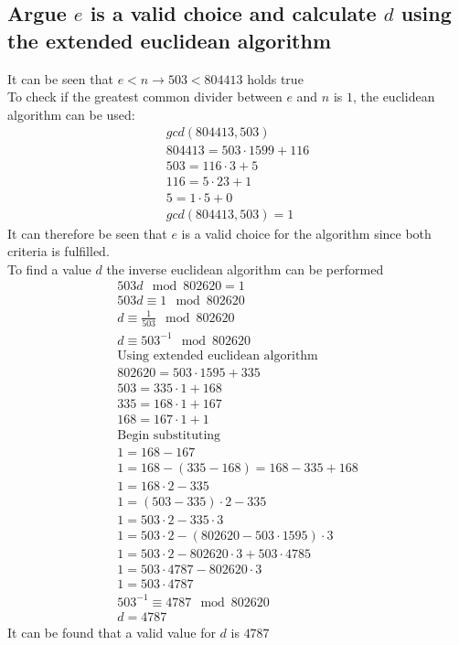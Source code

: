 \documentclass[12pt, a4paper]{article}
\begin{document}
		\subsection{Argue $e$ is a valid choice and calculate $d$ using the extended euclidean algorithm}
			It can be seen that $e<n\rightarrow 503 < 804413$ holds true\\
			To check if the greatest common divider between $e$ and $n$ is $1$, the euclidean algorithm can be used:
			\begin{align*}
				gcd(804413,503)\\
				804413 = 503\cdot 1599+116\\
				503=116\cdot 3+5\\
				116=5\cdot 23+1\\
				5=1\cdot 5+0\\
				gcd(804413,503)=1
			\end{align*}
			It can therefore be seen that $e$ is a valid choice for the algorithm since both criteria is fulfilled.\\
			To find a value $d$ the inverse euclidean algorithm can be performed
			\begin{align*}
				503d\mod 802620 = 1\\
				503d\equiv 1 \mod 802620\\
				d\equiv \frac{1}{503}\mod 802620\\
				d\equiv 503^{-1}\mod 802620\\
				\text{Using extended euclidean algorithm}\\
				802620=503\cdot 1595+335\\
				503=335\cdot 1 + 168\\
				335=168\cdot 1 + 167\\
				168=167\cdot 1 + 1\\[4mm]
				\text{Begin substituting}\\
				1=168-167\\
				1=168-(335-168)=168-335+168\\
				1=168\cdot 2 - 335\\
				1=(503-335)\cdot 2 - 335\\
				1=503\cdot 2 - 335 \cdot 3 \\
				1=503\cdot 2 - (802620-503\cdot 1595)\cdot 3\\
				1=503\cdot 2 - 802620\cdot 3 + 503\cdot 4785\\
				1=503\cdot 4787-802620\cdot 3\\
				1=503\cdot 4787\\[4mm]
				503^{-1}\equiv 4787 \mod 802620\\
				d=4787
			\end{align*} 
			It can be found that a valid value for $d$ is $4787$
\end{document}
